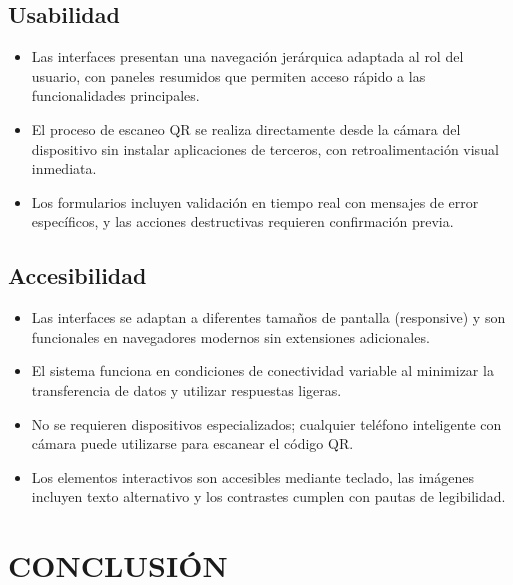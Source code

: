 \documentclass[12pt, letterpaper, oneside]{report}
\begin{document}
\section{Usabilidad}

\begin{itemize}
  \item Las interfaces presentan una navegaci\'on jer\'arquica adaptada al rol del usuario, con paneles resumidos que permiten acceso r\'apido a las funcionalidades principales.
  \item El proceso de escaneo QR se realiza directamente desde la c\'amara del dispositivo sin instalar aplicaciones de terceros, con retroalimentaci\'on visual inmediata.
  \item Los formularios incluyen validaci\'on en tiempo real con mensajes de error espec\'ificos, y las acciones destructivas requieren confirmaci\'on previa.
\end{itemize}

\section{Accesibilidad}

\begin{itemize}
  \item Las interfaces se adaptan a diferentes tama\~nos de pantalla (responsive) y son funcionales en navegadores modernos sin extensiones adicionales.
  \item El sistema funciona en condiciones de conectividad variable al minimizar la transferencia de datos y utilizar respuestas ligeras.
  \item No se requieren dispositivos especializados; cualquier tel\'efono inteligente con c\'amara puede utilizarse para escanear el c\'odigo QR.
  \item Los elementos interactivos son accesibles mediante teclado, las im\'agenes incluyen texto alternativo y los contrastes cumplen con pautas de legibilidad.
\end{itemize}

\newpage

\chapter*{CONCLUSI\'ON}
\end{document}
